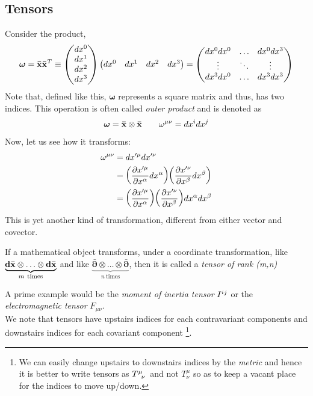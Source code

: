 \subsection{Tensors}
Consider the product,
$$\boldsymbol{\omega} = \vb{\bar{x}} \vb{\bar{x}}^T \equiv \begin{pmatrix}
    dx^0\\dx^1\\dx^2\\dx^3
\end{pmatrix} \begin{pmatrix}
    dx^0&dx^1&dx^2&dx^3
\end{pmatrix}= \begin{pmatrix}
    dx^0dx^0& \ldots &dx^0dx^3\\
    \vdots& \ddots &\vdots\\
     dx^3dx^0& \ldots &dx^3dx^3
\end{pmatrix}$$
Note that, defined like this, $\boldsymbol{\omega}$ represents a square matrix and thus, has two indices. This operation is often called \textit{outer product} and is denoted as $$\boldsymbol{\omega} = \vb{\bar{x}}\otimes \vb{\bar{x}}\qquad \omega^{\mu\nu} = dx^i dx^j$$ Now, let us see how it transforms:
\begin{align*}
    \omega^{\mu\nu} &= dx'^\mu dx'^\nu \\
&= \qty(\pdv{x'^\mu}{x^\alpha}dx^\alpha)\qty(\pdv{x'^\nu}{x^\beta}dx^\beta)\\
&=\qty(\pdv{x'^\mu}{x^\alpha})\qty(\pdv{x'^\nu}{x^\beta})dx^\alpha dx^\beta
\end{align*}
This is yet another kind of transformation, different from either vector and covector. 
\begin{definition}[{Tensor}]
    If a mathematical object transforms, under a coordinate transformation, like $\underbrace{\vb{d\bar{x}}\otimes \ldots \otimes \vb{d\bar{x}}}_{m\ \mathrm{ times}}$ and like $\underbrace{\boldsymbol{\bar{\partial}}\otimes \ldots \otimes \boldsymbol{\bar{\partial}}}_{n\ \mathrm{ times}}$, then it is called a \textit{tensor of rank (m,n)}
\end{definition}
A prime example would be the \textit{moment of inertia tensor} $\tensor{I}{^{ij}}$ or the \textit{electromagnetic tensor} $F_{\mu\nu}$. \\
We note that tensors have upstairs indices for each contravariant components and downstairs indices for each covariant component \footnote{We can easily change upstairs to downstairs indices by the \textit{metric} and hence it is better to write tensors as $\tensor{T}{^\mu _\nu }$ and not $T^\mu_\nu$ so as to keep a vacant place for the indices to move up/down.}.

